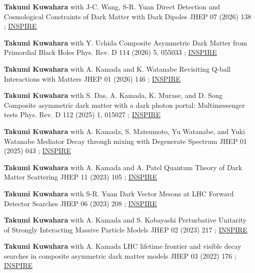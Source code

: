 
\begin{publist}

\pubentry
  {\textbf{Takumi Kuwahara} with J-C. Wang, S-R. Yuan}
  {Direct Detection and Cosmological Constraints of Dark Matter with Dark Dipoles}
  {JHEP 07 (2026) 138}
  {; \href{https://inspirehep.net/literature/3117352}{INSPIRE}}

\pubentry
  {\textbf{Takumi Kuwahara} with Y. Uchida}
  {Composite Asymmetric Dark Matter from Primordial Black Holes}
  {Phys. Rev. D 114 (2026) 5, 055033}
  {; \href{https://inspirehep.net/literature/3085099}{INSPIRE}}

\pubentry
  {\textbf{Takumi Kuwahara} with A. Kamada and K. Watanabe}
  {Revisiting Q-ball Interactions with Matters}
  {JHEP 01 (2026) 146}
  {; \href{https://inspirehep.net/literature/2946508}{INSPIRE}}

\pubentry
  {\textbf{Takumi Kuwahara} with S. Das, A. Kamada, K. Murase, and D. Song}
  {Composite asymmetric dark matter with a dark photon portal: Multimessenger tests}
  {Phys. Rev. D 112 (2025) 1, 015027}
  {; \href{https://inspirehep.net/literature/2861921}{INSPIRE}}

\pubentry
  {\textbf{Takumi Kuwahara} with A. Kamada, S. Matsumoto, Yu Watanabe, and Yuki Watanabe}
  {Mediator Decay through mixing with Degenerate Spectrum}
  {JHEP 01 (2025) 043}
  {; \href{https://inspirehep.net/literature/2775864}{INSPIRE}}

\pubentry
  {\textbf{Takumi Kuwahara} with A. Kamada and A. Patel}
  {Quantum Theory of Dark Matter Scattering}
  {JHEP 11 (2023) 105}
  {; \href{https://inspirehep.net/literature/2647767}{INSPIRE}}

\pubentry
  {\textbf{Takumi Kuwahara} with S-R. Yuan}
  {Dark Vector Mesons at LHC Forward Detector Searches}
  {JHEP 06 (2023) 208}
  {; \href{https://inspirehep.net/literature/2639057}{INSPIRE}}

\pubentry
  {\textbf{Takumi Kuwahara} with A. Kamada and S. Kobayashi}
  {Perturbative Unitarity of Strongly Interacting Massive Particle Models}
  {JHEP 02 (2023) 217}
  {; \href{https://inspirehep.net/literature/2159849}{INSPIRE}}

\pubentry
  {\textbf{Takumi Kuwahara} with A. Kamada}
  {LHC lifetime frontier and visible decay searches in composite asymmetric dark matter models}
  {JHEP 03 (2022) 176}
  {; \href{https://inspirehep.net/literature/1982942}{INSPIRE}}


\end{publist}
